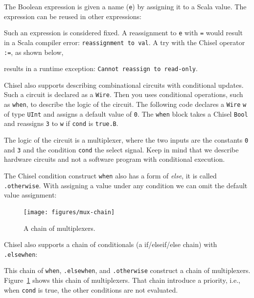 \documentclass[%
    10pt,
    headinclude, footexclude,
    openright, %
    notitlepage,
    cleardoubleempty,
    headsepline,
    pointlessnumbers,
    bibtotoc, idxtotoc,
    ]{scrbook}
\newcommand{\code}[1]{{\small{\texttt{#1}}}}
\begin{document}
\noindent The Boolean expression is given a name (\code{e}) by assigning it
to a Scala value. The expression can be reused in other expressions:


Such an expression is considered fixed. A reassignment to \code{e}
with \code{=} would result in a Scala compiler error: \code{reassignment to val}.
A try with the Chisel operator \code{:=}, as shown below,


\noindent results in a runtime exception: \code{Cannot reassign to read-only}.

Chisel also supports describing combinational circuits with conditional updates.
Such a circuit is declared as a \code{Wire}. Then you uses conditional operations,
such as \code{when}, to describe the logic of the circuit.
The following code declares a \code{Wire} \code{w} of type \code{UInt} and assigns a default
value of \code{0}. The \code{when} block takes a Chisel \code{Bool} and reassigns
\code{3} to \code{w} if \code{cond} is \code{true.B}.


\noindent The logic of the circuit is a multiplexer, where the two inputs are the constants
\code{0} and \code{3} and the condition \code{cond} the select signal.
Keep in mind that we describe hardware circuits and not a software program with conditional
execution.

The Chisel condition construct \code{when} also has a form of \emph{else}, it is called
\code{.otherwise}. With assigning a value under any condition we can omit the default
value assignment:



\begin{figure}
  \centering
  \texttt{[image: figures/mux-chain]}
  \caption{A chain of multiplexers.}
  \label{fig:mux-chain}
\end{figure}

Chisel also supports a chain of conditionals (a if/elseif/else chain) with \code{.elsewhen}:


\noindent This chain of \code{when}, \code{.elsewhen}, and \code{.otherwise}
construct a chain of multiplexers. Figure~\ref{fig:mux-chain} shows this chain of multiplexers.
That chain introduce a priority, i.e., when \code{cond} is true, the other conditions
are not evaluated.
\end{document}
